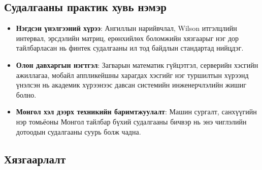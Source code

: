 \subsection{Судалгааны практик хувь нэмэр}

\begin{itemize}
    \item \textbf{Нэгдсэн үнэлгээний хүрээ}: Ангиллын нарийвчлал, Wilson итгэлцлийн интервал, эрсдэлийн матриц, ерөнхийлөх боломжийн хязгаарыг нэг дор тайлбарласан нь финтек судалгааны ил тод байдлын стандартад нийцдэг.
    \item \textbf{Олон давхаргын нэгтгэл}: Загварын математик гүйцэтгэл, серверийн хэсгийн ажиллагаа, мобайл аппликейшны харагдах хэсгийг нэг туршилтын хүрээнд үнэлсэн нь академик хүрээнээс давсан системийн инженерчлэлийн жишиг болно.
    \item \textbf{Монгол хэл дээрх техникийн баримтжуулалт}: Машин сургалт, санхүүгийн нэр томьёоны Монгол тайлбар бүхий судалгааны бичвэр нь энэ чиглэлийн дотоодын судалгааны суурь болж чадна.
\end{itemize}

\subsection{Хязгаарлалт}
\label{sec:limitations}

